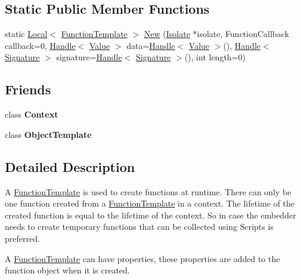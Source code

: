 \subsection*{Static Public Member Functions}
\begin{DoxyCompactItemize}
\item 
static \hyperlink{classv8_1_1Local}{Local}$<$ \hyperlink{classv8_1_1FunctionTemplate}{Function\-Template} $>$ \hyperlink{classv8_1_1FunctionTemplate_a67822fdf0ef2ac00e20e923e649f3f5f}{New} (\hyperlink{classv8_1_1Isolate}{Isolate} $\ast$isolate, Function\-Callback callback=0, \hyperlink{classv8_1_1Handle}{Handle}$<$ \hyperlink{classv8_1_1Value}{Value} $>$ data=\hyperlink{classv8_1_1Handle}{Handle}$<$ \hyperlink{classv8_1_1Value}{Value} $>$(), \hyperlink{classv8_1_1Handle}{Handle}$<$ \hyperlink{classv8_1_1Signature}{Signature} $>$ signature=\hyperlink{classv8_1_1Handle}{Handle}$<$ \hyperlink{classv8_1_1Signature}{Signature} $>$(), int length=0)
\end{DoxyCompactItemize}
\subsection*{Friends}
\begin{DoxyCompactItemize}
\item 
\hypertarget{classv8_1_1FunctionTemplate_ac26c806e60ca4a0547680edb68f6e39b}{class {\bfseries Context}}\label{classv8_1_1FunctionTemplate_ac26c806e60ca4a0547680edb68f6e39b}

\item 
\hypertarget{classv8_1_1FunctionTemplate_a4d28646409234f556983be8a96c06424}{class {\bfseries Object\-Template}}\label{classv8_1_1FunctionTemplate_a4d28646409234f556983be8a96c06424}

\end{DoxyCompactItemize}


\subsection{Detailed Description}
A \hyperlink{classv8_1_1FunctionTemplate}{Function\-Template} is used to create functions at runtime. There can only be one function created from a \hyperlink{classv8_1_1FunctionTemplate}{Function\-Template} in a context. The lifetime of the created function is equal to the lifetime of the context. So in case the embedder needs to create temporary functions that can be collected using Scripts is preferred.

A \hyperlink{classv8_1_1FunctionTemplate}{Function\-Template} can have properties, these properties are added to the function object when it is created.

